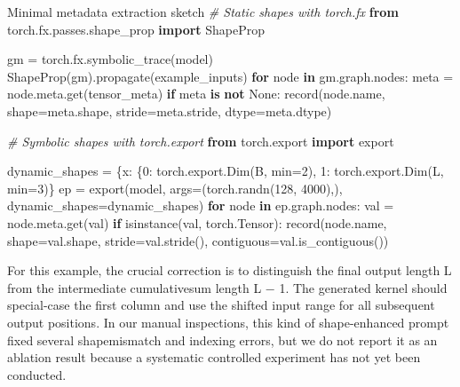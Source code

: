 \documentclass[
  10
]{article}
\newenvironment{Shaded}{}{}
\newcommand{\BuiltInTok}[1]{\textcolor[rgb]{0.00,0.50,0.00}{#1}}
\newcommand{\CommentTok}[1]{\textcolor[rgb]{0.38,0.63,0.69}{\textit{#1}}}
\newcommand{\ControlFlowTok}[1]{\textcolor[rgb]{0.00,0.44,0.13}{\textbf{#1}}}
\newcommand{\DecValTok}[1]{\textcolor[rgb]{0.25,0.63,0.44}{#1}}
\newcommand{\ImportTok}[1]{\textcolor[rgb]{0.00,0.50,0.00}{\textbf{#1}}}
\newcommand{\KeywordTok}[1]{\textcolor[rgb]{0.00,0.44,0.13}{\textbf{#1}}}
\newcommand{\NormalTok}[1]{#1}
\newcommand{\OperatorTok}[1]{\textcolor[rgb]{0.40,0.40,0.40}{#1}}
\newcommand{\StringTok}[1]{\textcolor[rgb]{0.25,0.44,0.63}{#1}}
\newcommand{\VariableTok}[1]{\textcolor[rgb]{0.10,0.09,0.49}{#1}}
\begin{document}
\begin{Shaded}
\begin{Highlighting}[]
\NormalTok{Minimal metadata extraction sketch}
\CommentTok{\# Static shapes with torch.fx}
\ImportTok{from}\NormalTok{ torch.fx.passes.shape\_prop }\ImportTok{import}\NormalTok{ ShapeProp}

\NormalTok{gm }\OperatorTok{=}\NormalTok{ torch.fx.symbolic\_trace(model)}
\NormalTok{ShapeProp(gm).propagate(example\_inputs)}
\ControlFlowTok{for}\NormalTok{ node }\KeywordTok{in}\NormalTok{ gm.graph.nodes:}
\NormalTok{    meta }\OperatorTok{=}\NormalTok{ node.meta.get(}\StringTok{\textquotesingle{}tensor\_meta\textquotesingle{}}\NormalTok{)}
    \ControlFlowTok{if}\NormalTok{ meta }\KeywordTok{is} \KeywordTok{not} \VariableTok{None}\NormalTok{:}
\NormalTok{    record(node.name, shape}\OperatorTok{=}\NormalTok{meta.shape, stride}\OperatorTok{=}\NormalTok{meta.stride, dtype}\OperatorTok{=}\NormalTok{meta.dtype)}

\CommentTok{\# Symbolic shapes with torch.export}
\ImportTok{from}\NormalTok{ torch.export }\ImportTok{import}\NormalTok{ export}

\NormalTok{dynamic\_shapes }\OperatorTok{=}\NormalTok{ \{}\StringTok{\textquotesingle{}x\textquotesingle{}}\NormalTok{: \{}\DecValTok{0}\NormalTok{: torch.export.Dim(}\StringTok{\textquotesingle{}B\textquotesingle{}}\NormalTok{, }\BuiltInTok{min}\OperatorTok{=}\DecValTok{2}\NormalTok{),}
    \DecValTok{1}\NormalTok{: torch.export.Dim(}\StringTok{\textquotesingle{}L\textquotesingle{}}\NormalTok{, }\BuiltInTok{min}\OperatorTok{=}\DecValTok{3}\NormalTok{)\}}
\NormalTok{ep }\OperatorTok{=}\NormalTok{ export(model, args}\OperatorTok{=}\NormalTok{(torch.randn(}\DecValTok{128}\NormalTok{, }\DecValTok{4000}\NormalTok{),), dynamic\_shapes}\OperatorTok{=}\NormalTok{dynamic\_shapes)}
\ControlFlowTok{for}\NormalTok{ node }\KeywordTok{in}\NormalTok{ ep.graph.nodes:}
\NormalTok{    val }\OperatorTok{=}\NormalTok{ node.meta.get(}\StringTok{\textquotesingle{}val\textquotesingle{}}\NormalTok{)}
    \ControlFlowTok{if} \BuiltInTok{isinstance}\NormalTok{(val, torch.Tensor):}
\NormalTok{    record(node.name, shape}\OperatorTok{=}\NormalTok{val.shape, stride}\OperatorTok{=}\NormalTok{val.stride(),}
\NormalTok{    contiguous}\OperatorTok{=}\NormalTok{val.is\_contiguous()) }
\end{Highlighting}
\end{Shaded}

For this example, the crucial correction is to distinguish the final
output length L from the intermediate cumulativesum length L − 1. The
generated kernel should special-case the first column and use the
shifted input range for all subsequent output positions. In our manual
inspections, this kind of shape-enhanced prompt fixed several
shapemismatch and indexing errors, but we do not report it as an
ablation result because a systematic controlled experiment has not yet
been conducted.
\end{document}
